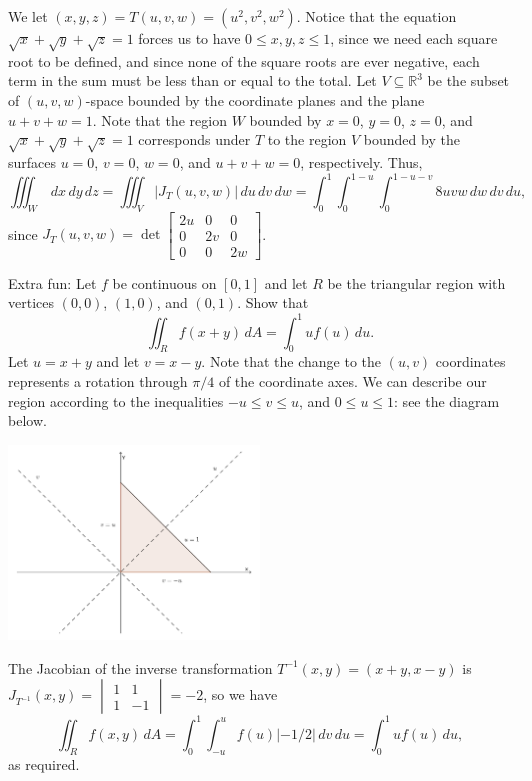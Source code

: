 \documentclass[letterpaper,12pt]{article}
\newcommand{\R}{\mathbb{R}}
\begin{document}
\begin{enumerate}
We let $(x,y,z) = T(u,v,w) = (u^2,v^2,w^2)$. Notice that the equation $\sqrt{x}+\sqrt{y}+\sqrt{z}=1$ forces us to have $0\leq x,y,z\leq 1$, since we need each square root to be defined, and since none of the square roots are ever negative, each term in the sum must be less than or equal to the total. Let $V\subseteq \R^3$ be the subset of $(u,v,w)$-space bounded by the coordinate planes and the plane $u+v+w=1$. Note that the region $W$ bounded by $x=0$, $y=0$, $z=0$, and $\sqrt{x}+\sqrt{y}+\sqrt{z}=1$ corresponds under $T$ to the region $V$ bounded by the surfaces $u=0$, $v=0$, $w=0$, and $u+v+w=0$, respectively. Thus,
\[
 \iiint_W \,dx\,dy\,dz = \iiint_V \lvert J_T(u,v,w)\rvert \,du\,dv\,dw = \int_0^1\int_0^{1-u}\int_0^{1-u-v} 8uvw\,dw\,dv\,du,
\]
since $J_T(u,v,w) = \det\begin{bmatrix}2u&0&0\\0&2v&0\\0&0&2w\end{bmatrix}$.

\end{enumerate}



Extra fun:  Let $f$ be continuous on $[0,1]$ and let $R$ be the triangular region with vertices $(0,0)$, $(1,0)$, and $(0,1)$. Show that
\[
\iint_R f(x+y)\,dA = \int_0^1uf(u)\,du.
\]
Let $u=x+y$ and let $v=x-y$. Note that the change to the $(u,v)$ coordinates represents a rotation through $\pi/4$ of the coordinate axes. We can describe our region according to the inequalities $-u\leq v\leq u$, and $0\leq u\leq 1$: see the diagram below.
\begin{center}
 \includegraphics[width=0.5\textwidth]{Q15-bonus}
\end{center}
The Jacobian of the inverse transformation $T^{-1}(x,y) = (x+y,x-y)$ is $J_{T^{-1}}(x,y) = \begin{vmatrix}1&1\\1&-1\end{vmatrix} = -2$, so we have
\[
 \iint_R f(x,y)\,dA = \int_0^1\int_{-u}^u f(u)\lvert -1/2\rvert \,dv\,du = \int_0^1 uf(u)\,du,
\]
as required.
\end{document}
